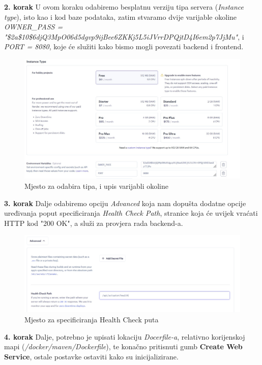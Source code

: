 			\textbf{2. korak} \newline U ovom koraku odabiremo besplatnu verziju tipa servera (\textit{Instance type}), isto kao i kod baze podataka, zatim stvaramo dvije varijable okoline \newline \textit{OWNER\_PASS = "\$2a\$10\$6djQ3MpO06d5dgvp9ijBee6ZKKj5L5iJVrrDPQjtD4I6em2p7JjMu"}, i \textit{PORT = 8080},
			koje će služiti kako bismo mogli povezati backend i frontend.
			\begin{figure}[H]
				\includegraphics[width=\linewidth]{slike/BackendPtToo.JPG}
				\centering
				\caption{Mjesto za odabira tipa, i upis varijabli okoline}
				\label{fig:Backend drugi}
			\end{figure}
			\textbf{3. korak} \newline Dalje odabiremo opciju \textit{Advanced} koja nam dopušta dodatne opcije uređivanja poput specificiranja \textit{Health Check Path}, stranice koja će uvijek vraćati HTTP kod "200 OK", a služi za provjera rada backend-a.
			\begin{figure}[H]
				\includegraphics[width=\linewidth]{slike/BackendPtTree.JPG}
				\centering
				\caption{Mjesto za specificiranja Health Check puta}
				\label{fig:Backend treći}
			\end{figure}
			\textbf{4. korak} \newline Dalje, potrebno je upisati lokaciju \textit{Docerfile-a}, relativno korijenskoj mapi (\textit{/docker/maven/Dockerfile}), te konačno pritisnuti gumb \textbf{Create Web Service}, ostale postavke ostaviti kako su inicijalizirane.
